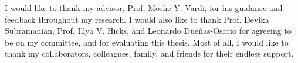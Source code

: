 \acknowledge
I would like to thank my advisor, Prof. Moshe Y. Vardi, for his guidance and feedback throughout my research. I would also like to thank Prof. Devika Subramanian, Prof. Illya V. Hicks, and Leonardo Due{\~n}as-Osorio for agreeing to be on my committee, and for evaluating this thesis. 
Most of all, I would like to thank my collaborators, colleagues, family, and friends for their endless support.